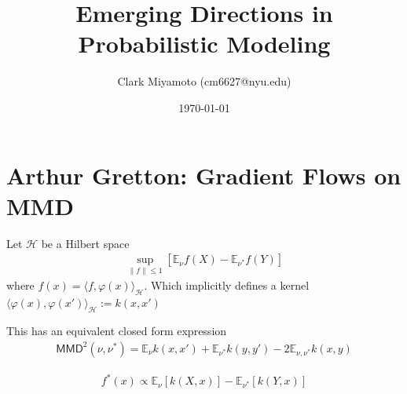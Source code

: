 \documentclass[11pt,fleqn]{article}
\title{Emerging Directions in Probabilistic Modeling}
\author{Clark Miyamoto (cm6627@nyu.edu)}
\date{\today}
\numberwithin{equation}{section}
\theoremstyle{definition}
\theoremstyle{definition}
\begin{document}
\maketitle

\tableofcontents


\newpage
\section{Arthur Gretton: Gradient Flows on MMD}
\begin{definition}
	 Let $\mathcal H$ be a Hilbert space
	\begin{align}
		\sup_{\|f\| \leq 1} [\mathbb E_\nu f(X) - \mathbb E_{\nu^*} f(Y)]
	\end{align}
	where $f(x) = \langle f, \varphi(x) \rangle_{\mathcal H}$. Which implicitly defines a kernel $\langle \varphi(x), \varphi(x')\rangle_{\mathcal H} := k(x, x')$
\end{definition}
This has an equivalent closed form expression
\begin{align}
	\textsf{MMD}^2(\nu, \nu^*) = \mathbb E_\nu k(x,x') + \mathbb E_{\nu^*}k(y, y') - 2 \mathbb E_{\nu, \nu^*} k (x,y)
\end{align}
\begin{definition}
	\begin{align}
		f^*(x) \propto \mathbb E_{\nu}[k (X,x)]- \mathbb E_{\nu^*}[k(Y, x)]
	\end{align}
\end{definition}
\end{document}
